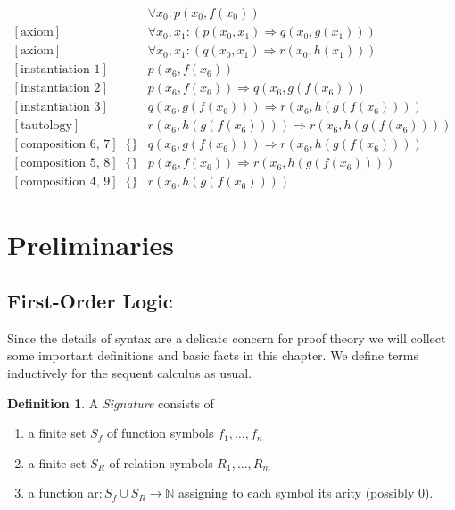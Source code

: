 \documentclass[onehalfspacing]{article}
\theoremstyle{definition}
\theoremstyle{definition}
\theoremstyle{definition}
\theoremstyle{definition}
\theoremstyle{definition}
\newtheorem{definition}[theorem]{Definition}
\theoremstyle{definition}
\begin{document}
\setcounter{equation}{0}
\begin{align}
	[\text{axiom}] && \forall x_0: p(x_0,f(x_0))\\
	[\text{axiom}] && \forall x_0, x_1 : (p(x_0,x_1) \Rightarrow q(x_0,g(x_1)))\\
	[\text{axiom}] && \forall x_0, x_1 : (q(x_0,x_1) \Rightarrow r(x_0,h(x_1)))\\
	[\text{instantiation 1}] && p(x_6, f(x_6))\\
	[\text{instantiation 2}] && p(x_6, f(x_6))\Rightarrow q(x_6,g(f(x_6))) \\
	[\text{instantiation 3}] && q(x_6, g(f(x_6)))\Rightarrow r(x_6,h(g(f(x_6)))) \\
	[\text{tautology}] && r(x_6, h(g(f(x_6))))\Rightarrow r(x_6,h(g(f(x_6))))\\
	[\text{composition 6, 7}] &\{\}&q(x_6, g(f(x_6)))\Rightarrow r(x_6,h(g(f(x_6))))\\
	[\text{composition 5, 8}] &\{\}&p(x_6,f(x_6))\Rightarrow r(x_6, h(g(f(x_6))))\\
	[\text{composition 4, 9}] &\{\}&r(x_6, h(g(f(x_6))))
\end{align}



\pagebreak
{}
\section{Preliminaries}

\subsection{First-Order Logic}
Since the details of syntax are a delicate concern for proof theory we will collect some important definitions and basic facts in this chapter. We define terms inductively for the sequent calculus as usual.

\begin{definition}
	A \textit{Signature} consists of
	\begin{enumerate}
		\item a finite set $S_f$ of function symbols $f_1, \dots, f_n$
		\item a finite set $S_R$ of relation symbols $R_1,\dots, R_m$
		\item  a function ar$: S_f\cup S_R\to \mathbb{N}$ assigning to each symbol its arity (possibly 0).
	\end{enumerate}
\end{definition}
\end{document}
